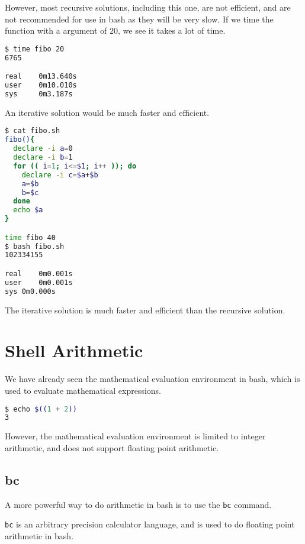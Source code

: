 However, most recursive solutions, including this one, are not efficient, and are not recommended for use in bash as they will be very slow.
If we time the function with a argument of $20$, we see it takes a lot of time.

\begin{lstlisting}[language=bash]
$ time fibo 20
6765

real    0m13.640s
user    0m10.010s
sys     0m3.187s
\end{lstlisting}

An iterative solution would be much faster and efficient.

\begin{lstlisting}[language=bash]
$ cat fibo.sh
fibo(){
  declare -i a=0
  declare -i b=1
  for (( i=1; i<=$1; i++ )); do
    declare -i c=$a+$b
    a=$b
    b=$c
  done
  echo $a
}

time fibo 40
$ bash fibo.sh
102334155

real	0m0.001s
user	0m0.001s
sys	0m0.000s
\end{lstlisting}

The iterative solution is much faster and efficient than the recursive solution.

\section{Shell Arithmetic}

We have already seen the mathematical evaluation environment in bash, which is used to evaluate mathematical expressions.

\begin{lstlisting}[language=bash]
$ echo $((1 + 2))
3
\end{lstlisting}

However, the mathematical evaluation environment is limited to integer arithmetic, and does not support floating point arithmetic.

\subsection{bc}

A more powerful way to do arithmetic in bash is to use the \lstinline|bc| command.

\begin{definition}[BC]
  \lstinline|bc| is an arbitrary precision calculator language, and is used to do floating point arithmetic in bash.
\end{definition}

